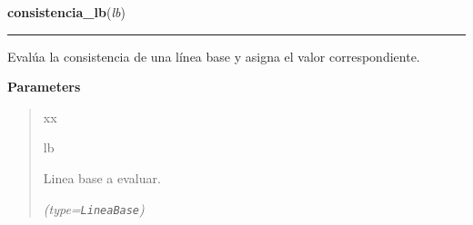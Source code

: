 \hspace{.8\funcindent}\begin{boxedminipage}{\funcwidth}

    \raggedright \textbf{consistencia\_lb}(\textit{lb})

    \vspace{-1.5ex}

    \rule{\textwidth}{0.5\fboxrule}
\setlength{\parskip}{2ex}
    Evalúa la consistencia de una línea base y asigna el valor 
    correspondiente.

\setlength{\parskip}{1ex}
      \textbf{Parameters}
      \vspace{-1ex}

      \begin{quote}
        \begin{Ventry}{xx}

          \item[lb]

          Linea base a evaluar.

            {\it (type=\texttt{LineaBase})}

        \end{Ventry}

      \end{quote}

    \end{boxedminipage}

    \label{saip:lib:func:proximo_id}

    \vspace{0.5ex}

